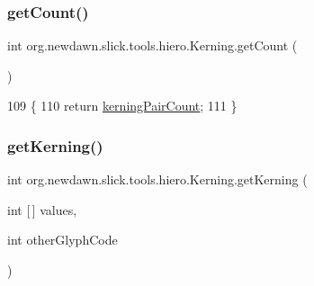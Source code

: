 \subsubsection{\texorpdfstring{get\+Count()}{getCount()}}
{\footnotesize\ttfamily int org.\+newdawn.\+slick.\+tools.\+hiero.\+Kerning.\+get\+Count (\begin{DoxyParamCaption}{ }\end{DoxyParamCaption})\hspace{0.3cm}{\ttfamily [inline]}}


\begin{DoxyCode}
109                            \{
110         \textcolor{keywordflow}{return} \mbox{\hyperlink{classorg_1_1newdawn_1_1slick_1_1tools_1_1hiero_1_1_kerning_a5d054877d909331426a9195b9ce1d133}{kerningPairCount}};
111     \}
\end{DoxyCode}
\mbox{\label{classorg_1_1newdawn_1_1slick_1_1tools_1_1hiero_1_1_kerning_ab54e98c75369ce50198fe27f4973a613}} 
\subsubsection{\texorpdfstring{get\+Kerning()}{getKerning()}}
{\footnotesize\ttfamily int org.\+newdawn.\+slick.\+tools.\+hiero.\+Kerning.\+get\+Kerning (\begin{DoxyParamCaption}\item[{int \mbox{[}$\,$\mbox{]}}]{values,  }\item[{int}]{other\+Glyph\+Code }\end{DoxyParamCaption})\hspace{0.3cm}{\ttfamily [inline]}}


